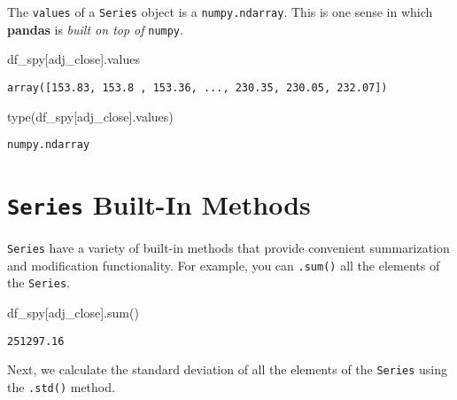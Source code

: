 \documentclass[
  letterpaper,
  DIV=11,
  numbers=noendperiod]{scrreprt}
\newenvironment{Shaded}{\begin{snugshade}}{\end{snugshade}}
\newcommand{\BuiltInTok}[1]{\textcolor[rgb]{0.00,0.23,0.31}{#1}}
\newcommand{\NormalTok}[1]{\textcolor[rgb]{0.00,0.23,0.31}{#1}}
\newcommand{\StringTok}[1]{\textcolor[rgb]{0.13,0.47,0.30}{#1}}
\begin{document}
The \texttt{values} of a \texttt{Series} object is a
\texttt{numpy.ndarray}. This is one sense in which \textbf{pandas} is
\emph{built on top of} \texttt{numpy}.

\begin{Shaded}
\begin{Highlighting}[]
\NormalTok{df\_spy[}\StringTok{\textquotesingle{}adj\_close\textquotesingle{}}\NormalTok{].values}
\end{Highlighting}
\end{Shaded}

\begin{verbatim}
array([153.83, 153.8 , 153.36, ..., 230.35, 230.05, 232.07])
\end{verbatim}

\begin{Shaded}
\begin{Highlighting}[]
\BuiltInTok{type}\NormalTok{(df\_spy[}\StringTok{\textquotesingle{}adj\_close\textquotesingle{}}\NormalTok{].values)}
\end{Highlighting}
\end{Shaded}

\begin{verbatim}
numpy.ndarray
\end{verbatim}

\hypertarget{series-built-in-methods}{%
\section{\texorpdfstring{\texttt{Series} Built-In
Methods}{Series Built-In Methods}}\label{series-built-in-methods}}

\texttt{Series} have a variety of built-in methods that provide
convenient summarization and modification functionality. For example,
you can \texttt{.sum()} all the elements of the \texttt{Series}.

\begin{Shaded}
\begin{Highlighting}[]
\NormalTok{df\_spy[}\StringTok{\textquotesingle{}adj\_close\textquotesingle{}}\NormalTok{].}\BuiltInTok{sum}\NormalTok{()}
\end{Highlighting}
\end{Shaded}

\begin{verbatim}
251297.16
\end{verbatim}

Next, we calculate the standard deviation of all the elements of the
\texttt{Series} using the \texttt{.std()} method.
\end{document}
